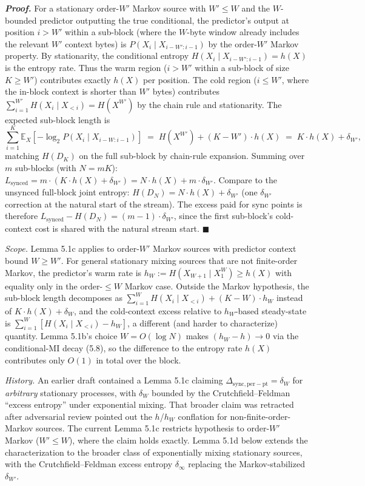 \documentclass[
]{article}
\begin{document}
\emph{\textbf{Proof.}} For a stationary order-$W'$ Markov source with
$W' \leq W$ and the $W$-bounded predictor outputting the true
conditional, the predictor's output at position $i > W'$ within a
sub-block (where the $W$-byte window already includes the relevant
$W'$ context bytes) is $P(X_i \mid X_{i-W':i-1})$ by the
order-$W'$ Markov property. By stationarity, the conditional entropy
$H(X_i \mid X_{i-W':i-1}) = h(X)$ is the entropy rate. Thus the
warm region ($i > W'$ within a sub-block of size $K \geq W'$)
contributes exactly $h(X)$ per position. The cold region
($i \leq W'$, where the in-block context is shorter than $W'$
bytes) contributes $\sum_{i=1}^{W'} H(X_i \mid X_{<i}) = H(X^{W'})$
by the chain rule and stationarity. The expected sub-block length is
\[
\sum_{i=1}^{K} \mathbb{E}_X[-\log_2 P(X_i \mid X_{i-W:i-1})]
\;=\; H(X^{W'}) + (K - W') \cdot h(X)
\;=\; K \cdot h(X) + \delta_{W'},
\]
matching $H(D_K)$ on the full sub-block by chain-rule expansion.
Summing over $m$ sub-blocks (with $N = m K$):
$L_{\mathrm{synced}} = m \cdot (K \cdot h(X) + \delta_{W'}) =
N \cdot h(X) + m \cdot \delta_{W'}$. Compare to the unsynced full-block
joint entropy: $H(D_N) = N \cdot h(X) + \delta_{W'}$ (one $\delta_{W'}$
correction at the natural start of the stream). The excess paid for
sync points is therefore
$L_{\mathrm{synced}} - H(D_N) = (m - 1) \cdot \delta_{W'}$, since the
first sub-block's cold-context cost is shared with the natural
stream start. \hfill$\blacksquare$

\emph{Scope.} Lemma 5.1c applies to order-$W'$ Markov sources with
predictor context bound $W \geq W'$. For general stationary mixing
sources that are not finite-order Markov, the predictor's warm rate is
$h_W := H(X_{W+1} \mid X_1^W) \geq h(X)$ with equality only in the
order-$\leq W$ Markov case. Outside the Markov hypothesis, the
sub-block length decomposes as
$\sum_{i=1}^{W} H(X_i \mid X_{<i}) + (K-W) \cdot h_W$ instead of
$K \cdot h(X) + \delta_W$, and the cold-context excess relative to
$h_W$-based steady-state is
$\sum_{i=1}^{W} [H(X_i \mid X_{<i}) - h_W]$, a different (and harder
to characterize) quantity. Lemma 5.1b's choice $W = O(\log N)$ makes
$(h_W - h) \to 0$ via the conditional-MI decay (5.8), so the difference
to the entropy rate $h(X)$ contributes only $O(1)$ in total over the
block.

\emph{History.} An earlier draft contained a Lemma 5.1c claiming
$\Delta_{\mathrm{sync, per-pt}} = \delta_W$ for \emph{arbitrary}
stationary processes, with $\delta_W$ bounded by the
Crutchfield--Feldman ``excess entropy'' under exponential mixing. That
broader claim was retracted after adversarial review pointed out the
$h$/$h_W$ conflation for non-finite-order-Markov sources. The current
Lemma 5.1c restricts hypothesis to order-$W'$ Markov ($W' \leq W$),
where the claim holds exactly. Lemma 5.1d below extends the
characterization to the broader class of exponentially mixing
stationary sources, with the Crutchfield--Feldman excess entropy
$\delta_\infty$ replacing the Markov-stabilized $\delta_{W'}$.
\end{document}
